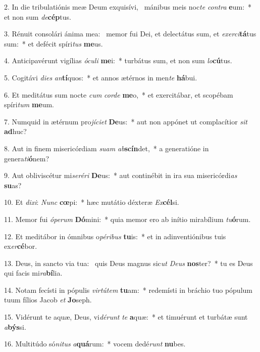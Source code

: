 2. In die tribulatiónis meæ Deum exquisívi, \dag\  mánibus meis noc\textit{te} \textit{con}\textit{tra} \textbf{e}um:~*  et non sum \textit{de}\textbf{cép}tus.\

3. Rénuit consolári ánima mea: \dag\  memor fui Dei, et delectátus sum, et \textit{ex}\textit{er}\textit{ci}\textbf{tá}tus sum:~*  et defécit spíri\textit{tus} \textbf{me}us.\

4. Anticipavérunt vigílias \textit{ó}\textit{cu}\textit{li} \textbf{me}i:~*  turbátus sum, et non sum \textit{lo}\textbf{cú}tus.\

5. Cogitávi \textit{di}\textit{es} \textit{an}\textbf{tí}quos:~*  et annos ætérnos in men\textit{te} \textbf{há}bui.\

6. Et meditátus sum nocte \textit{cum} \textit{cor}\textit{de} \textbf{me}o,~*  et exercitábar, et scopébam spíri\textit{tum} \textbf{me}um.\

7. Numquid in ætérnum pro\textit{jí}\textit{ci}\textit{et} \textbf{De}us:~*  aut non appónet ut complacítior \textit{sit} \textbf{ad}huc?\

8. Aut in finem misericórdiam \textit{su}\textit{am} \textit{ab}\textbf{scín}det,~*  a generatióne in genera\textit{ti}\textbf{ó}nem?\

9. Aut obliviscétur mi\textit{se}\textit{ré}\textit{ri} \textbf{De}us:~*  aut continébit in ira sua misericórdi\textit{as} \textbf{su}as?\

10. Et \textit{di}\textit{xi}: \textit{Nunc} \textbf{cœ}pi:~*  hæc mutátio déxteræ \textit{Ex}\textbf{cél}si.\

11. Memor fui \textit{ó}\textit{pe}\textit{rum} \textbf{Dó}mini:~*  quia memor ero ab inítio mirabílium \textit{tu}\textbf{ó}rum.\

12. Et meditábor in ómnibus o\textit{pé}\textit{ri}\textit{bus} \textbf{tu}is:~*  et in adinventiónibus tuis ex\textit{er}\textbf{cé}bor.\

13. Deus, in sancto via tua: \dag\  quis Deus magnus sic\textit{ut} \textit{De}\textit{us} \textbf{nos}ter?~*  tu es Deus qui facis mi\textit{ra}\textbf{bí}lia.\

14. Notam fecísti in pópulis \textit{vir}\textit{tú}\textit{tem} \textbf{tu}am:~*  redemísti in bráchio tuo pópulum tuum fílios Jacob \textit{et} \textbf{Jo}seph.\

15. Vidérunt te aquæ, Deus, vi\textit{dé}\textit{runt} \textit{te} \textbf{a}quæ:~*  et timuérunt et turbátæ sunt \textit{a}\textbf{býs}si.\

16. Multitúdo só\textit{ni}\textit{tus} \textit{a}\textbf{quá}rum:~*  vocem dedé\textit{runt} \textbf{nu}bes.\

